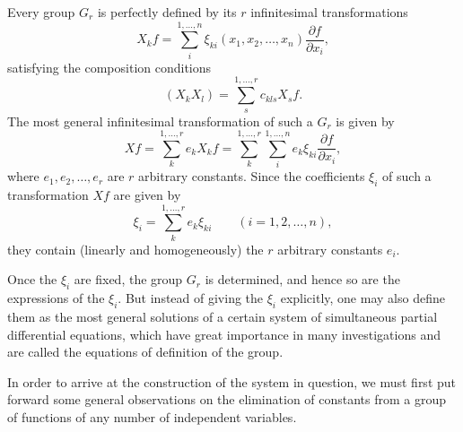 \documentclass[11pt]{book}
\begin{document}
Every group $G_r$ is perfectly defined by its $r$ infinitesimal transformations
\[
 X_k f=\sum\limits_i^{1,\ldots,n}\xi_{ki}(x_1,x_2,\ldots,x_n)\frac{\partial f}{\partial x_i},
\]
satisfying the composition conditions
\[
 (X_kX_l)=\sum\limits_s^{1,\ldots,r}c_{kls}X_sf.
\]
The most general infinitesimal transformation of such a $G_r$ is given by
\[
 Xf=\sum\limits_k^{1,\ldots,r}e_kX_kf
   =\sum\limits_k^{1,\ldots,r}\sum\limits_i^{1,\ldots,n}
     e_k\xi_{ki}\frac{\partial f}{\partial x_i},
\]
where $e_1,e_2,\ldots,e_r$ are $r$ arbitrary constants. Since the coefficients $\xi_i$ of such a transformation $Xf$ are given by
\[
 \xi_i=\sum\limits_k^{1,\ldots,r}e_k\xi_{ki}
 \qquad (i=1,2,\ldots,n),
\]
they contain (linearly and homogeneously) the $r$ arbitrary constants $e_i$.

Once the $\xi_i$ are fixed, the group $G_r$ is determined, and hence so are the expressions of the $\xi_i$. But instead of giving the $\xi_i$ explicitly, one may also define them as the most general solutions of a certain system of simultaneous partial differential equations, which have great importance in many investigations and are called the equations of definition of the group.

In order to arrive at the construction of the system in question, we must first put forward some general observations on the elimination of constants from a group of functions of any number of independent variables.
\end{document}
